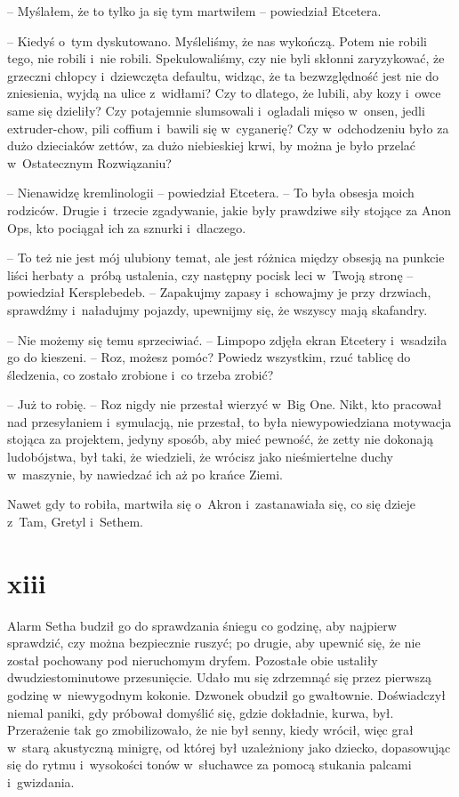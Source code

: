 \documentclass[oneside,polish,11pt,sfheadings]{mwbk}
\begin{document}
-- Myślałem, że to tylko ja się tym martwiłem -- powiedział Etcetera.

-- Kiedyś o~tym dyskutowano. Myśleliśmy, że nas wykończą. Potem nie
robili tego, nie robili i~nie robili. Spekulowaliśmy, czy nie byli
skłonni zaryzykować, że grzeczni chłopcy i~dziewczęta defaultu, widząc,
że ta bezwzględność jest nie do zniesienia, wyjdą na ulice z~widłami?
Czy to dlatego, że lubili, aby kozy i~owce same się dzieliły? Czy
potajemnie slumsowali i~ogladali mięso w~onsen, jedli extruder-chow,
pili coffium i~bawili się w~cyganerię? Czy w~odchodzeniu było za dużo
dzieciaków zettów, za dużo niebieskiej krwi, by można je było przelać w~Ostatecznym Rozwiązaniu?

-- Nienawidzę kremlinologii -- powiedział Etcetera. -- To była obsesja
moich rodziców. Drugie i~trzecie zgadywanie, jakie były prawdziwe siły
stojące za Anon Ops, kto pociągał ich za sznurki i~dlaczego.

-- To też nie jest mój ulubiony temat, ale jest różnica między obsesją na
punkcie liści herbaty a~próbą ustalenia, czy następny pocisk leci w~Twoją stronę -- powiedział Kersplebedeb. -- Zapakujmy zapasy i~schowajmy
je przy drzwiach, sprawdźmy i~naładujmy pojazdy, upewnijmy się, że
wszyscy mają skafandry.

-- Nie możemy się temu sprzeciwiać. -- Limpopo zdjęła ekran Etcetery i~wsadziła go do kieszeni. -- Roz, możesz pomóc? Powiedz wszystkim, rzuć
tablicę do śledzenia, co zostało zrobione i~co trzeba zrobić?

-- Już to robię. -- Roz nigdy nie przestał wierzyć w~Big One. Nikt, kto
pracował nad przesyłaniem i~symulacją, nie przestał, to była
niewypowiedziana motywacja stojąca za projektem, jedyny sposób, aby mieć
pewność, że zetty nie dokonają ludobójstwa, był taki, że wiedzieli, że
wrócisz jako nieśmiertelne duchy w~maszynie, by nawiedzać ich aż po
krańce Ziemi.

Nawet gdy to robiła, martwiła się o~Akron i~zastanawiała się, co się
dzieje z~Tam, Gretyl i~Sethem.

\chapter*{xiii}

Alarm Setha budził go do sprawdzania śniegu co godzinę, aby najpierw
sprawdzić, czy można bezpiecznie ruszyć; po drugie, aby upewnić się, że
nie został pochowany pod nieruchomym dryfem. Pozostałe obie ustaliły
dwudziestominutowe przesunięcie. Udało mu się zdrzemnąć się przez
pierwszą godzinę w~niewygodnym kokonie. Dzwonek obudził go gwałtownie.
Doświadczył niemal paniki, gdy próbował domyślić się, gdzie dokładnie,
kurwa, był. Przerażenie tak go zmobilizowało, że nie był senny, kiedy
wrócił, więc grał w~starą akustyczną minigrę, od której był uzależniony
jako dziecko, dopasowując się do rytmu i~wysokości tonów w~słuchawce za
pomocą stukania palcami i~gwizdania.
\end{document}
